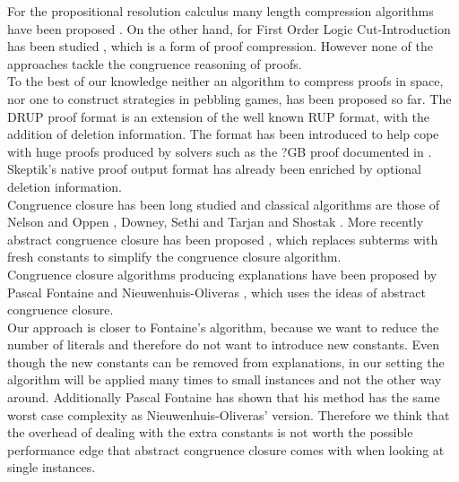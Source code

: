 For the propositional resolution calculus many length compression algorithms have been proposed \cite{Bar-Ilan2009,Boudou2013,Fontaine2011a,Cotton2010}. 
On the other hand, for First Order Logic Cut-Introduction has been studied \cite{Hetzl2012}, which is a form of proof compression. However none of the approaches tackle the congruence reasoning of proofs.\\
To the best of our knowledge neither an algorithm to compress proofs in space, nor one to construct strategies in pebbling games, has been proposed so far. 
The DRUP proof format \cite{Heule} is an extension of the well known RUP format, with the addition of deletion information.
The format has been introduced to help cope with huge proofs produced by solvers such as the ?GB proof documented in \cite{TODO: the big proof thing}.
Skeptik's native proof output format has already been enriched by optional deletion information.\\
Congruence closure has been long studied and classical algorithms are those of Nelson and Oppen \cite{Nelson1980}, Downey, Sethi and Tarjan \cite{Downey1980} and Shostak \cite{Shostak1978}. %
More recently abstract congruence closure has been proposed \cite{Bachmair2000}, which replaces subterms with fresh constants to simplify the congruence closure algorithm.\\
Congruence closure algorithms producing explanations have been proposed by Pascal Fontaine \cite{Fontaine2004} and Nieuwenhuis-Oliveras \cite{Nieuwenhuis2005a,Nieuwenhuis2007}, which uses the ideas of abstract congruence closure.\\
Our approach is closer to Fontaine's algorithm, because we want to reduce the number of literals and therefore do not want to introduce new constants.
Even though the new constants can be removed from explanations, in our setting the algorithm will be applied many times to small instances and not the other way around. 
Additionally Pascal Fontaine has shown that his method has the same worst case complexity as Nieuwenhuis-Oliveras' version. Therefore we think that the overhead of dealing with the extra constants is not worth the possible performance edge \cite{Bachmair2000} that abstract congruence closure comes with when looking at single instances.